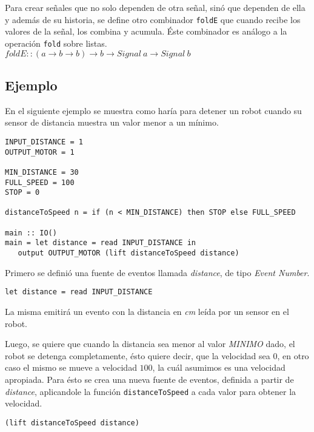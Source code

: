 Para crear señales que no solo dependen de otra señal, sinó que dependen
de ella y además de su historia, se define otro combinador \texttt{foldE}
que cuando recibe los valores de la señal, los combina y acumula. Éste
combinador es análogo a la operación \texttt{fold} sobre listas.\\

$foldE :: (a \rightarrow b \rightarrow b) \rightarrow b \rightarrow Signal\ a \rightarrow Signal\ b$\\

\subsection{Ejemplo}

En el siguiente ejemplo se muestra como haría para detener un
robot cuando su sensor de distancia muestra un valor menor a un mínimo.

\begin{verbatim}
INPUT_DISTANCE = 1
OUTPUT_MOTOR = 1

MIN_DISTANCE = 30
FULL_SPEED = 100
STOP = 0

distanceToSpeed n = if (n < MIN_DISTANCE) then STOP else FULL_SPEED

main :: IO()
main = let distance = read INPUT_DISTANCE in
   output OUTPUT_MOTOR (lift distanceToSpeed distance)

\end{verbatim}

Primero se definió una fuente de eventos llamada \emph{distance},
de tipo \emph{Event Number}.

\begin{verbatim}
let distance = read INPUT_DISTANCE
\end{verbatim}

La misma emitirá un evento con la distancia en \emph{cm} leída
por un sensor en el robot.

  Luego, se quiere que cuando la distancia sea menor al valor
\emph{MINIMO} dado, el robot se detenga completamente, ésto
quiere decir, que la velocidad sea $0$, en otro caso el mismo
se mueve a velocidad $100$, la cuál asumimos es una velocidad
apropiada.
  Para ésto se crea una nueva fuente de eventos, definida a partir
de \emph{distance}, aplicandole la función \texttt{distanceToSpeed} 
a cada valor para obtener la velocidad.

\begin{verbatim}
(lift distanceToSpeed distance)
\end{verbatim}

